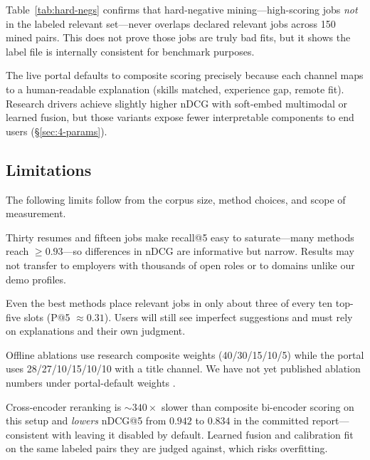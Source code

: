 Table~\ref{tab:hard-negs} confirms that hard-negative mining---high-scoring jobs \emph{not} in the labeled relevant set---never overlaps declared relevant jobs across 150 mined pairs.
This does not prove those jobs are truly bad fits, but it shows the label file is internally consistent for benchmark purposes.

\begin{JTable}

\end{JTable}

The live portal defaults to composite scoring precisely because each channel maps to a human-readable explanation (skills matched, experience gap, remote fit).
Research drivers achieve slightly higher nDCG with soft-embed multimodal or learned fusion, but those variants expose fewer interpretable components to end users (\S\ref{sec:4-params}).

\subsection{Limitations}\label{sec:6-limitations}\label{sec:6-fairness}\label{sec:6-hard-negs}\label{sec:6-latency}

The following limits follow from the corpus size, method choices, and scope of measurement.

Thirty resumes and fifteen jobs make recall@5 easy to saturate---many methods reach ${\ge}0.93$---so differences in nDCG are informative but narrow.
Results may not transfer to employers with thousands of open roles or to domains unlike our demo profiles.

Even the best methods place relevant jobs in only about three of every ten top-five slots (P@5 $\approx 0.31$).
Users will still see imperfect suggestions and must rely on explanations and their own judgment.

Offline ablations use research composite weights (40/30/15/10/5) while the portal uses 28/27/10/15/10/10 with a title channel.
We have not yet published ablation numbers under portal-default weights .

Cross-encoder reranking is ${\sim}340\times$ slower than composite bi-encoder scoring on this setup and \emph{lowers} nDCG@5 from $0.942$ to $0.834$ in the committed report---consistent with leaving it disabled by default.
Learned fusion and calibration fit on the same labeled pairs they are judged against, which risks overfitting.

